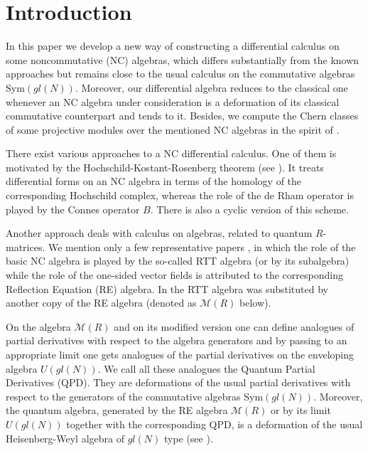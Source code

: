 \documentclass[11pt]{article}
\newcommand{\MM}{\mathcal{M}}
\numberwithin{equation}{section}
\theoremstyle{plain}
\theoremstyle{definition}
\begin{document}
\maketitle

\section{Introduction}\label{sec:introduction}

In this  paper we develop a new way of constructing a differential calculus on some noncommutative (NC) algebras, which
differs substantially from the known approaches but remains close to the usual calculus on the commutative algebras
$\mathrm{Sym}(gl(N))$. Moreover, our differential algebra reduces to the classical one whenever an NC algebra under
consideration is a deformation of its classical commutative counterpart and tends to it. Besides, we compute the
Chern classes of some projective modules over the mentioned NC algebras in the spirit of \cite{Gom}.

 There exist various approaches to a NC differential calculus. One  of them is motivated by the
Hochschild-Kostant-Rosenberg theorem (see \cite{L}). It treats differential forms on an NC algebra in terms of the homology of the
corresponding Hochschild complex, whereas  the role of the de Rham operator is played by the Connes operator $B$. There is
also a cyclic version of this scheme.

Another approach deals with calculus on algebras, related to  quantum $R$-matrices. We  mention only a few representative
papers  \cite{BM, FP, P, WZ, W}, in which the role of the basic NC algebra is played by the so-called RTT algebra (or by its subalgebra)
while the role of the one-sided vector fields is attributed to the corresponding Reflection Equation (RE) algebra. In \cite{GPS2} the RTT
algebra was substituted by another copy of the RE algebra  (denoted as $\MM(R)$ below).

On the algebra $\MM(R)$  and on its modified version one can define analogues of partial derivatives with respect
to the algebra generators and by passing to an appropriate limit one gets analogues of the partial derivatives on the enveloping algebra
$U(gl(N))$. We call all these analogues the Quantum Partial Derivatives (QPD). They are deformations of the usual partial derivatives with
respect to the generators of the commutative algebras $\mathrm{Sym}(gl(N))$. Moreover, the quantum  algebra, generated by the RE
algebra $\MM(R)$ or by its limit $U(gl(N))$ together with the corresponding QPD, is a deformation of the usual Heisenberg-Weyl
algebra of $gl(N)$ type (see \cite{GPS2}).
\end{document}

